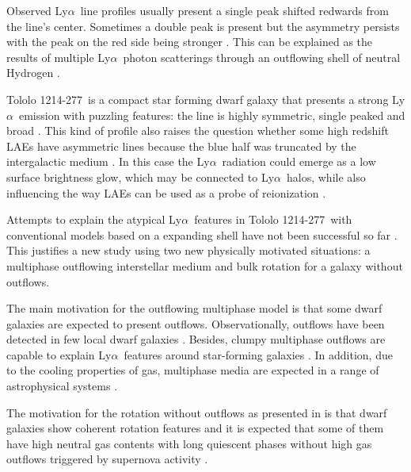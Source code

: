 \documentclass[a4paper,fleqn,usenatbib]{mnras}
\newcommand{\tol}{Tololo 1214-277}
\newcommand{\lya}{\ifmmode{{\rm Ly}\alpha}\else Ly$\alpha$\ \fi}
\begin{document}
Observed \lya line profiles usually present a single peak shifted
redwards from the line's center. 
Sometimes a double peak is present but the asymmetry persists with 
the peak on the red side being stronger \citep[e.g.][]{2010ApJ...717..289S,Erb14,Trainor16}. 
This can be explained as the results of multiple \lya photon
scatterings through an outflowing shell of neutral Hydrogen
\citep{2006A&A...460..397V,Orsi12,2012ApJ...751...29Y,2015ApJ...812..123G}.

\tol\ is a compact star forming dwarf galaxy that presents a
strong \lya emission with puzzling 
features: the line is highly symmetric, single peaked and broad 
\citep{Thuan97}.
This kind of profile also raises the question whether some high
redshift LAEs have asymmetric lines because the blue half was
truncated by the intergalactic medium \citep{2007MNRAS.377.1175D}. 
In this case the \lya radiation could emerge as a low surface
brightness glow, which may be connected to \lya halos, while also
influencing the way LAEs can be used as a probe of reionization
\citep[see the review by][and references therein]{2014PASA...31...40D}. 

Attempts to explain the atypical \lya features in \tol\ with
conventional models based on a expanding shell have not been successful
so far \citep{mashesse03,2015A&A...578A...7V}. 
This justifies a new study using two new physically motivated
situations: a multiphase outflowing interstellar medium and bulk rotation for a
galaxy without outflows.

The main motivation for the outflowing multiphase model \citep[as presented
in][]{Gronke2016} is that some dwarf galaxies are expected to
present outflows.  
Observationally, outflows have been detected in few local dwarf galaxies
\citep{1998ApJ...506..222M,2005MNRAS.358.1453O}. 
Besides, clumpy multiphase outflows are capable to explain \lya features around
star-forming galaxies
\citep{2010ApJ...717..289S,2012MNRAS.424.1672D}.
In addition, due to the cooling properties of gas, multiphase media are expected
in a range of astrophysical systems
\citep[][]{1977ApJ...218..148M,2016arXiv161001164M}. 

The motivation for the rotation without outflows as presented in
\citep[as presented in]{GaravitoCamargo2014} is that dwarf galaxies show coherent
rotation features  \citep{2009A&A...493..871S} and it is expected that
some of them have high neutral gas contents with long quiescent phases
without high gas outflows triggered by supernova activity
\citep{2005A&A...433L...1B,2008ApJ...672..888T,2013MNRAS.434.2491G}.   
\end{document}
